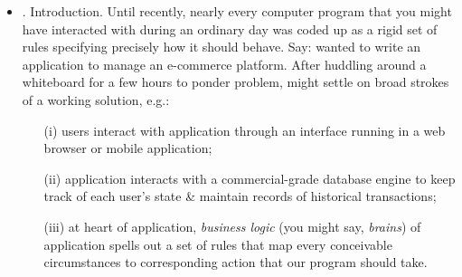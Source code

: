 \documentclass{article}
\begin{document}
\begin{itemize}
\begin{itemize}
		Can install PyTorch (specified versions are tested at time of writing) with either CPU or GPU support as follows:
		\begin{verbatim}
			pip install torch==2.0.0 torchvision==0.15.1
		\end{verbatim}
		Next step: to install {\tt d2l} package developed in order to encapsulate frequently used functions \& classes found throughout this book:
		\begin{verbatim}
			pip install d2l==1.0.3
		\end{verbatim}
		\item {\bf Downloading \& Running Code.} Download notebooks so that can run each of book's code blocks. Simply click on ``Notebooks'' tab at top of any HTML page on \url{https://d2l.ai/} to download code \& then unzip it. Alternatively, can fetch notebooks from command line as follows:
		\begin{verbatim}
			mkdir d2l-en && cd d2l-en
			curl https://d2l.ai/d2l-en-1.0.3.zip -o d2l-en.zip
			unzip d2l-en.zip && rm d2l-en.zip
			cd pytorch
		\end{verbatim}
		{\tt SKIP INSTALLATION STEPS}
	\end{itemize}
	\item {. Introduction.} Until recently, nearly every computer program that you might have interacted with during an ordinary day was coded up as a rigid set of rules specifying precisely how it should behave. Say: wanted to write an application to manage an e-commerce platform. After huddling around a whiteboard for a few hours to ponder problem, might settle on broad strokes of a working solution, e.g.:
	\begin{itemize}
		\item[(i)] users interact with application through an interface running in a web browser or mobile application;
		\item[(ii)] application interacts with a commercial-grade database engine to keep track of each user's state \& maintain records of historical transactions;
		\item[(iii)] at heart of application, {\it business logic} (you might say, {\it brains}) of application spells out a set of rules that map every conceivable circumstances to corresponding action that our program should take.
	\end{itemize}

\end{itemize}
\end{document}
